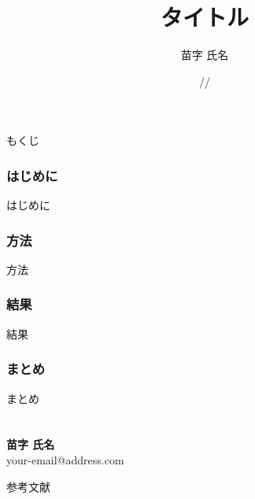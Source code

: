 \documentclass[aspectratio=169,dvipdfmx,cjk]{beamer}
\title{タイトル}
\author{苗字 氏名}
\date{\the\year/\the\month/\the\day}
\institute[東京大学]{東京大学 工学部 マテリアル工学科}
\begin{document}
\begingroup

    \maketitle
\endgroup


\begin{frame}[plain]{もくじ}
    \tableofcontents[hideallsubsections]
\end{frame}

\section{はじめに}
\begin{frame}{はじめに}

\end{frame}

\section{方法}
\begin{frame}{方法}
    
\end{frame}

\section{結果}
\begin{frame}{結果}
    
\end{frame}

\section{まとめ}
\begin{frame}{まとめ}
    
\end{frame}

\part*{}
\begingroup
    \begin{frame}
        \begin{center}
            {\bf 苗字 氏名}\\
            {\scriptsize your-email@address.com}\\
        \end{center}
    \end{frame}

    \begin{frame}[plain]{参考文献}
        \nocite{*}
        \printbibliography
    \end{frame}
\endgroup
\end{document}
